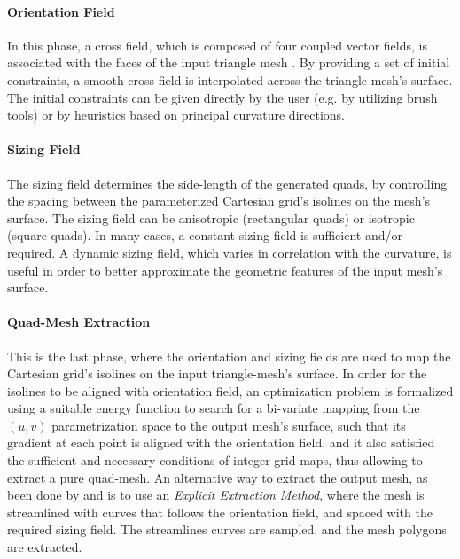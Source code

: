 \paragraph{Orientation Field} In this phase, a cross field, which is composed of four coupled vector fields, is associated with the faces of the input triangle mesh \cite{10.1145/1356682.1356683}. By providing a set of initial constraints, a smooth cross field is interpolated across the triangle-mesh's surface. The initial constraints can be given directly by the user (e.g. by utilizing brush tools) or by heuristics based on principal curvature directions.

\paragraph{Sizing Field} The sizing field determines the side-length of the generated quads, by controlling the spacing between the parameterized Cartesian grid's isolines on the mesh's surface. The sizing field can be anisotropic (rectangular quads) or isotropic (square quads). In many cases, a constant sizing field is sufficient and/or required. A dynamic sizing field, which varies in correlation with the curvature, is useful in order to better approximate the geometric features of the input mesh's surface.

\paragraph{Quad-Mesh Extraction} This is the last phase, where the orientation and sizing fields are used to map the Cartesian grid's isolines on the input triangle-mesh's surface. In order for the isolines to be aligned with orientation field, an optimization problem is formalized using a suitable energy function to search for a bi-variate mapping from the $\left(u,v\right)$ parametrization space to the output mesh's surface, such that its gradient at each point is aligned with the orientation field, and it also satisfied the sufficient and necessary conditions of integer grid maps, thus allowing to extract a pure quad-mesh. An alternative way to extract the output mesh, as been done by \cite{10.1145/882262.882296} and \cite{10.5555/1025128.1026044} is to use an \emph{Explicit Extraction Method}, where the mesh is streamlined with curves that follows the orientation field, and spaced with the required sizing field. The streamlines curves are sampled, and the mesh polygons are extracted.

